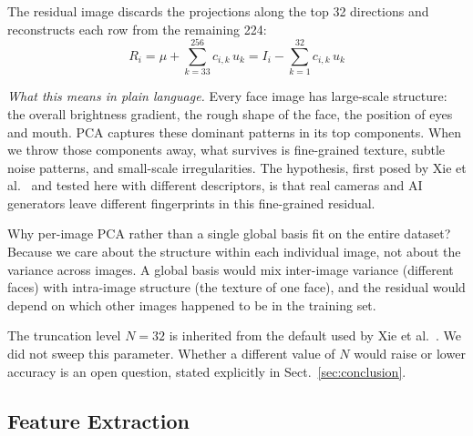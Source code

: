 \documentclass[runningheads]{llncs}
\begin{document}
The residual image discards the projections along the top 32 directions and reconstructs each row from the remaining 224:
\begin{equation}
R_i = \mu + \sum_{k=33}^{256} c_{i,k}\, u_k = I_i - \sum_{k=1}^{32} c_{i,k}\, u_k
\label{eq:residual}
\end{equation}

\textit{What this means in plain language.} Every face image has large-scale structure: the overall brightness gradient, the rough shape of the face, the position of eyes and mouth. PCA captures these dominant patterns in its top components. When we throw those components away, what survives is fine-grained texture, subtle noise patterns, and small-scale irregularities. The hypothesis, first posed by Xie et al.~\cite{xie2026} and tested here with different descriptors, is that real cameras and AI generators leave different fingerprints in this fine-grained residual.

Why per-image PCA rather than a single global basis fit on the entire dataset? Because we care about the structure within each individual image, not about the variance across images. A global basis would mix inter-image variance (different faces) with intra-image structure (the texture of one face), and the residual would depend on which other images happened to be in the training set.

The truncation level $N = 32$ is inherited from the default used by Xie et al.~\cite{xie2026}. We did not sweep this parameter. Whether a different value of $N$ would raise or lower accuracy is an open question, stated explicitly in Sect.~\ref{sec:conclusion}.



\subsection{Feature Extraction}
\end{document}
